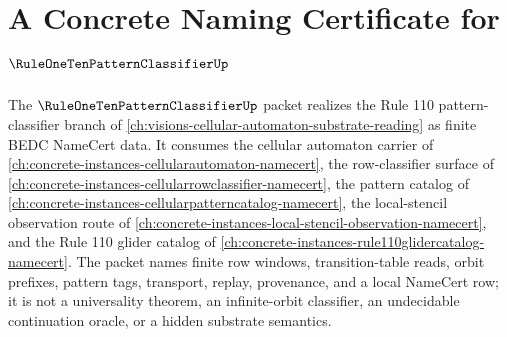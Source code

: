 \chapter{A Concrete Naming Certificate for $\RuleOneTenPatternClassifierUp$}
\label{ch:concrete-instances-rule110-pattern-classifier-namecert}

The $\RuleOneTenPatternClassifierUp$ packet realizes the Rule 110 pattern-classifier branch of \autoref{ch:visions-cellular-automaton-substrate-reading} as finite BEDC NameCert data. It consumes the cellular automaton carrier of \autoref{ch:concrete-instances-cellularautomaton-namecert}, the row-classifier surface of \autoref{ch:concrete-instances-cellularrowclassifier-namecert}, the pattern catalog of \autoref{ch:concrete-instances-cellularpatterncatalog-namecert}, the local-stencil observation route of \autoref{ch:concrete-instances-local-stencil-observation-namecert}, and the Rule 110 glider catalog of \autoref{ch:concrete-instances-rule110glidercatalog-namecert}. The packet names finite row windows, transition-table reads, orbit prefixes, pattern tags, transport, replay, provenance, and a local NameCert row; it is not a universality theorem, an infinite-orbit classifier, an undecidable continuation oracle, or a hidden substrate semantics.

